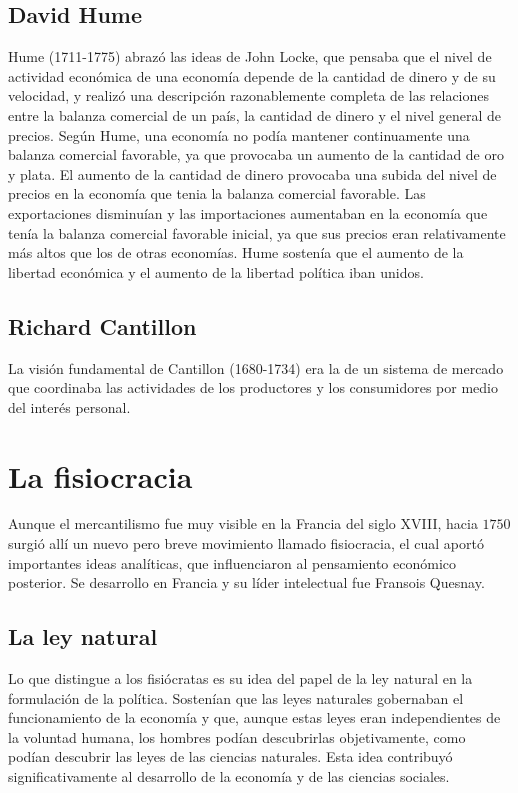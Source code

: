 \documentclass[10pt]{book}
\begin{document}
\subsection{David Hume}
Hume (1711-1775) abrazó las ideas de John Locke, que pensaba que el nivel de actividad económica de una economía depende de la cantidad de dinero y de su velocidad, y realizó una descripción razonablemente completa de las relaciones entre la balanza comercial de un país, la cantidad de dinero y el nivel general de precios. Según Hume, una economía no podía mantener continuamente una balanza comercial favorable, ya que provocaba un aumento de la cantidad de oro y plata. El aumento de la cantidad de dinero provocaba una subida del nivel de precios en la economía que tenia la balanza comercial favorable. Las exportaciones disminuían y las importaciones aumentaban en la economía que tenía la balanza comercial favorable inicial, ya que sus precios eran relativamente más altos que los de otras economías. Hume sostenía que el aumento de la libertad económica y el aumento de la libertad política iban unidos.

\subsection{Richard Cantillon}
La visión fundamental de Cantillon (1680-1734) era la de un sistema de mercado que coordinaba las actividades de los productores y los consumidores por medio del interés personal.

\section{La fisiocracia}
Aunque el mercantilismo fue muy visible en la Francia del siglo XVIII, hacia $1750$ surgió allí un nuevo pero breve movimiento llamado fisiocracia, el cual aportó importantes ideas analíticas, que influenciaron al pensamiento económico posterior. Se desarrollo en Francia y su líder intelectual fue Fransois Quesnay.

\subsection{La ley natural}
Lo que distingue a los fisiócratas es su idea del papel de la ley natural en la formulación de la política. Sostenían que las leyes naturales gobernaban el funcionamiento de la economía y que, aunque estas leyes eran independientes de la voluntad humana, los hombres podían descubrirlas objetivamente, como podían descubrir las leyes de las ciencias naturales. Esta idea contribuyó significativamente al desarrollo de la economía y de las ciencias sociales.
\end{document}
